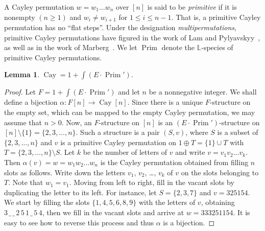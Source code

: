 \documentclass[a4paper, 11pt]{article}
\DeclareMathOperator{\Cay}{Cay}
\DeclareMathOperator{\Prim}{Prim}
\newcommand{\LL}{\mathbb{L}}
\theoremstyle{definition}
\newtheorem{lemma}[theorem]{Lemma}
\begin{document}
A Cayley permutation $w=w_1\ldots w_n$ over $[n]$ is said to be
\emph{primitive} if it is nonempty $(n \geq 1)$ and
$w_i \neq w_{i+1}$ for $1 \leq i \leq n-1$.
That is, a primitive Cayley permutation has no ``flat steps''.
Under the designation \emph{multipermutations}, primitive Cayley permutations 
have figured in the work of Lam and
Pylyavskyy~\cite{LP2007}, as well as in the work of
Marberg~\cite{Marberg2021}.
We let $\Prim$ denote the $\LL$-species of primitive Cayley permutations.

\begin{lemma}\label{lemma:prim}
  $\Cay = 1 + \int (E\cdot \Prim')$.
\end{lemma}
\begin{proof}
  Let $F=1 + \int (E\cdot \Prim')$ and let $n$ be a nonnegative integer.
  We shall define a bijection $\alpha:F[n]\to\Cay[n]$. Since
  there is a unique $F$-structure on the empty set, which can be mapped
  to the empty Cayley permutation, we may assume that $n>0$.
  Now, an $F$-structure on $[n]$ is an
  $(E\cdot \Prim')$-structure on
  $[n]\setminus\{1\}=\{2,3,\dots,n\}$. Such a structure is a
  pair $(S, v)$, where $S$ is a subset of $\{2,3,\dots,n\}$ and $v$ is a
  primitive Cayley permutation on $1\oplus T = \{1\}\cup T$ with
  $T=\{2,3,\dots,n\}\setminus S$. Let $k$ be the number of letters of
  $v$ and write $v=v_1v_2\ldots v_k$. Then $\alpha(v)=w=w_1w_2\dots w_n$
  is the Cayley permutation obtained from filling $n$ slots as follows.
  Write down the letters $v_1$, $v_2$, \dots, $v_k$ of $v$ on the slots
  belonging to $T$. Note that $w_1 = v_1$. Moving from left to right,
  fill in the vacant slots by duplicating the letter to its left.  For
  instance, let $S=\{2,3,7\}$ and $v=325154$. We start by filling the
  slots $\{1,4,5,6,8,9\}$ with the letters of $v$, obtaining
  $3\,\_\,\_\,2\,5\,1\,\_\,5\,4$, then we fill in the vacant slots and
  arrive at $w=333251154$. It is easy to see how to reverse this process
  and thus $\alpha$ is a bijection.
\end{proof}
\end{document}
